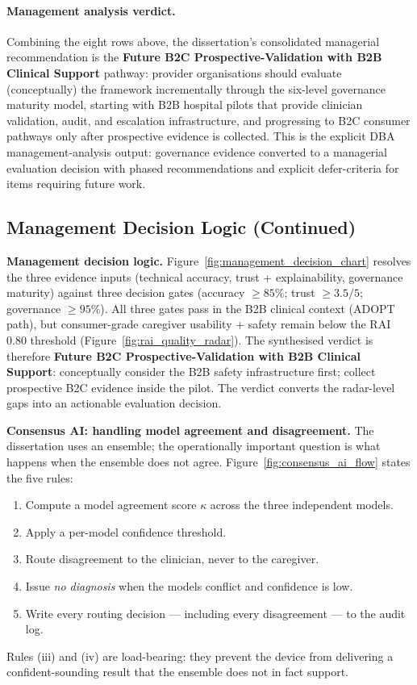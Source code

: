 \paragraph{Management analysis verdict.}
\label{para:management_analysis_verdict}
Combining the eight rows above, the dissertation's consolidated managerial recommendation is the \textbf{Future B2C Prospective-Validation with B2B Clinical Support} pathway: provider organisations should evaluate (conceptually) the framework incrementally through the six-level governance maturity model, starting with B2B hospital pilots that provide clinician validation, audit, and escalation infrastructure, and progressing to B2C consumer pathways only after prospective evidence is collected. This is the explicit DBA management-analysis output: governance evidence converted to a managerial evaluation decision with phased recommendations and explicit defer-criteria for items requiring future work.

\subsection{Management Decision Logic (Continued)}
\label{sec:management_decision_logic_continued}

\noindent\textbf{Management decision logic.} Figure~\ref{fig:management_decision_chart} resolves the three evidence inputs (technical accuracy, trust + explainability, governance maturity) against three decision gates (accuracy $\geq 85\%$; trust $\geq 3.5/5$; governance $\geq 95\%$). All three gates pass in the B2B clinical context (ADOPT path), but consumer-grade caregiver usability + safety remain below the RAI 0.80 threshold (Figure~\ref{fig:rai_quality_radar}). The synthesised verdict is therefore \textbf{Future B2C Prospective-Validation with B2B Clinical Support}: conceptually consider the B2B safety infrastructure first; collect prospective B2C evidence inside the pilot. The verdict converts the radar-level gaps into an actionable evaluation decision.



\noindent\textbf{Consensus AI: handling model agreement and disagreement.} The dissertation uses an ensemble; the operationally important question is what happens when the ensemble does not agree. Figure~\ref{fig:consensus_ai_flow} states the five rules:
\begin{enumerate}[leftmargin=*, itemsep=2pt, label=(\roman*)]
    \item Compute a model agreement score $\kappa$ across the three independent models.
    \item Apply a per-model confidence threshold.
    \item Route disagreement to the clinician, never to the caregiver.
    \item Issue \emph{no diagnosis} when the models conflict and confidence is low.
    \item Write every routing decision --- including every disagreement --- to the audit log.
\end{enumerate}
\noindent Rules (iii) and (iv) are load-bearing: they prevent the device from delivering a confident-sounding result that the ensemble does not in fact support.

